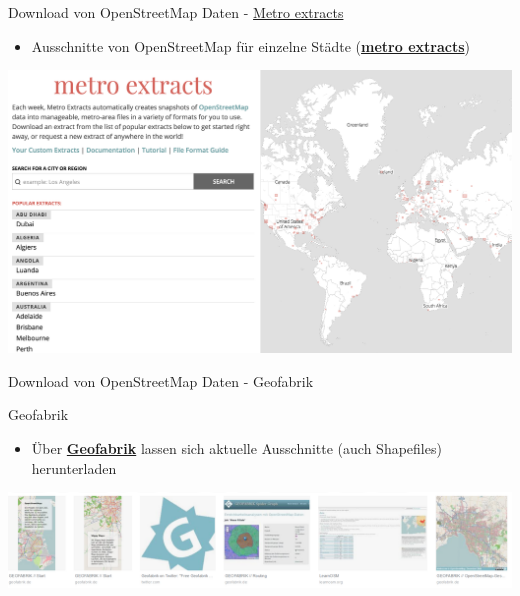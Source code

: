 \documentclass[ignorenonframetext,]{beamer}
\providecommand{\tightlist}{%
  \setlength{\itemsep}{0pt}\setlength{\parskip}{0pt}}
\begin{document}
\begin{frame}{Download von OpenStreetMap Daten -
\href{https://mapzen.com/}{Metro extracts}}
\protect\hypertarget{download-von-openstreetmap-daten---metro-extracts}{}

\begin{itemize}
\tightlist
\item
  Ausschnitte von OpenStreetMap für einzelne Städte
  (\href{https://mapzen.com/data/metro-extracts/}{\textbf{metro
  extracts}})
\end{itemize}

\includegraphics{figure/metroextracts.png}

\end{frame}

\begin{frame}{Download von OpenStreetMap Daten - Geofabrik}
\protect\hypertarget{download-von-openstreetmap-daten---geofabrik}{}

\begin{block}{Geofabrik}

\begin{itemize}
\tightlist
\item
  Über \href{http://download.geofabrik.de/}{\textbf{Geofabrik}} lassen
  sich aktuelle Ausschnitte (auch Shapefiles) herunterladen
\end{itemize}

\includegraphics{figure/Geofabrik.PNG}

\end{block}

\end{frame}
\end{document}
